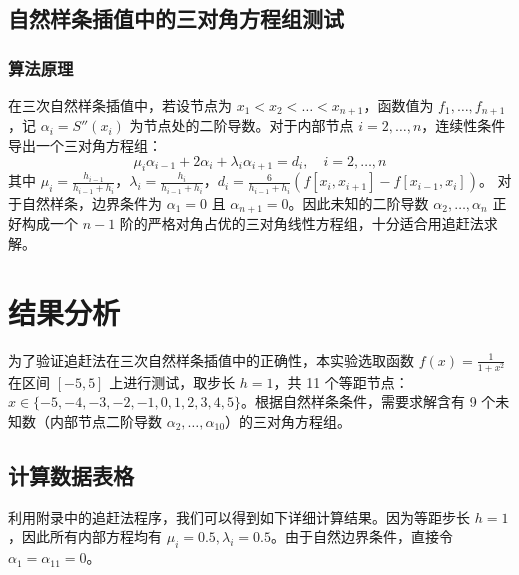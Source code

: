 \documentclass{article}
\begin{document}
\subsection{自然样条插值中的三对角方程组测试}
\subsubsection{算法原理}
在三次自然样条插值中，若设节点为 $x_1 < x_2 < \dots < x_{n+1}$，函数值为 $f_1, \dots, f_{n+1}$，记 $\alpha_i = S''(x_i)$ 为节点处的二阶导数。对于内部节点 $i=2,\dots,n$，连续性条件导出一个三对角方程组：
\begin{equation}
    \mu_i \alpha_{i-1} + 2\alpha_i + \lambda_i \alpha_{i+1} = d_i, \quad i=2,\dots,n
\end{equation}
其中 $\mu_i = \frac{h_{i-1}}{h_{i-1}+h_i}$，$\lambda_i = \frac{h_i}{h_{i-1}+h_i}$，$d_i = \frac{6}{h_{i-1}+h_i}(f[x_i, x_{i+1}] - f[x_{i-1}, x_i])$。
对于自然样条，边界条件为 $\alpha_1 = 0$ 且 $\alpha_{n+1} = 0$。因此未知的二阶导数 $\alpha_2, \dots, \alpha_n$ 正好构成一个 $n-1$ 阶的严格对角占优的三对角线性方程组，十分适合用追赶法求解。

\section{结果分析}
为了验证追赶法在三次自然样条插值中的正确性，本实验选取函数 $f(x) = \frac{1}{1+x^2}$ 在区间 $[-5, 5]$ 上进行测试，取步长 $h=1$，共 11 个等距节点：$x \in \{-5, -4, -3, -2, -1, 0, 1, 2, 3, 4, 5\}$。根据自然样条条件，需要求解含有 9 个未知数（内部节点二阶导数 $\alpha_2, \dots, \alpha_{10}$）的三对角方程组。

\subsection{计算数据表格}
利用附录中的追赶法程序，我们可以得到如下详细计算结果。因为等距步长 $h=1$，因此所有内部方程均有 $\mu_i = 0.5, \lambda_i = 0.5$。由于自然边界条件，直接令 $\alpha_1 = \alpha_{11} = 0$。
\end{document}
